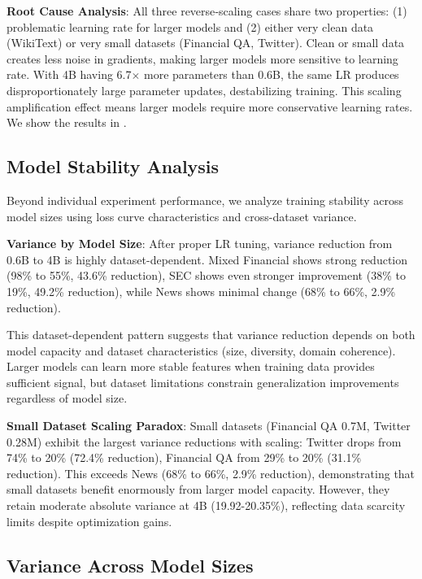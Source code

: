\textbf{Root Cause Analysis}: All three reverse‑scaling cases share two properties: (1) problematic learning rate for larger models and (2) either very clean data (WikiText) or very small datasets (Financial QA, Twitter). Clean or small data creates less noise in gradients, making larger models more sensitive to learning rate. With 4B having 6.7$\times$ more parameters than 0.6B, the same LR produces disproportionately large parameter updates, destabilizing training. This scaling amplification effect means larger models require more conservative learning rates. We show the results in .

\subsection{Model Stability Analysis}

Beyond individual experiment performance, we analyze training stability across model sizes using loss curve characteristics and cross-dataset variance.

\textbf{Variance by Model Size}: After proper LR tuning, variance reduction from 0.6B to 4B is highly dataset-dependent. Mixed Financial shows strong reduction (98\% to 55\%, 43.6\% reduction), SEC shows even stronger improvement (38\% to 19\%, 49.2\% reduction), while News shows minimal change (68\% to 66\%, 2.9\% reduction).

This dataset-dependent pattern suggests that variance reduction depends on both model capacity and dataset characteristics (size, diversity, domain coherence). Larger models can learn more stable features when training data provides sufficient signal, but dataset limitations constrain generalization improvements regardless of model size.

\textbf{Small Dataset Scaling Paradox}: Small datasets (Financial QA 0.7M, Twitter 0.28M) exhibit the largest variance reductions with scaling: Twitter drops from 74\% to 20\% (72.4\% reduction), Financial QA from 29\% to 20\% (31.1\% reduction). This exceeds News (68\% to 66\%, 2.9\% reduction), demonstrating that small datasets benefit enormously from larger model capacity. However, they retain moderate absolute variance at 4B (19.92-20.35\%), reflecting data scarcity limits despite optimization gains.

\subsection{Variance Across Model Sizes}

